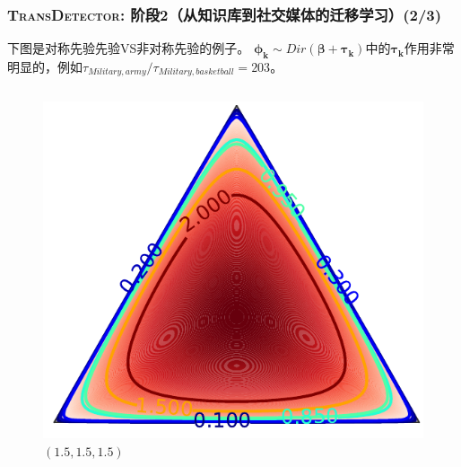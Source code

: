 \begin{frame}
\frametitle{\textsc{TransDetector}: 阶段2（从知识库到社交媒体的迁移学习）(2/3)}	

下图是对称先验先验VS非对称先验的例子。
\(\bm{\phi_k} \sim Dir(\bm{\beta}+ \bm{\tau_k})\)中的\(\bm{\tau_k}\)作用非常明显的，例如\(\tau_{Military,army}/\tau_{Military,basketball}=203\)。
\vspace{-5mm}
\begin{columns}
\begin{column}{0.48\paperwidth}
	\begin{figure}
		\caption{$(1.5,1.5,1.5)$}
		\includegraphics[width=0.4\paperwidth]{img/croppedDirichletGraph2.pdf}	
	\end{figure}

\end{column}


\end{columns}
\end{frame}
